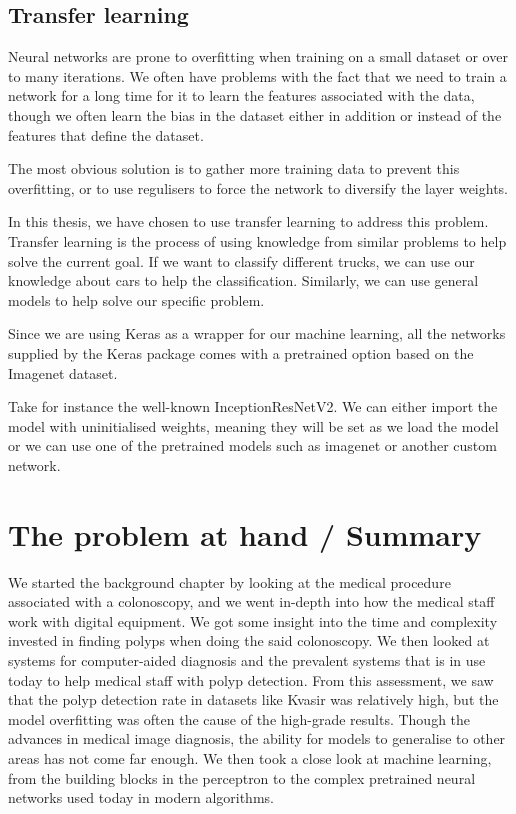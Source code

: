 \subsection{Transfer learning}
Neural networks are prone to overfitting when training on a small dataset or over to many iterations. We often have problems with the fact that we need to train a network for a long time for it to learn the features associated with the data, though we often learn the bias in the dataset either in addition or instead of the features that define the dataset.

The most obvious solution is to gather more training data to prevent this overfitting, or to use regulisers to force the network to diversify the layer weights. 

In this thesis, we have chosen to use transfer learning to address this problem. Transfer learning is the process of using knowledge from similar problems to help solve the current goal.  If we want to classify different trucks, we can use our knowledge about cars to help the classification.
Similarly, we can use general models to help solve our specific problem.

Since we are using Keras as a wrapper for our machine learning, all the networks supplied by the Keras package comes with a pretrained option based on the Imagenet dataset.


Take for instance the well-known InceptionResNetV2. We can either import the model with uninitialised weights, meaning they will be set as we load the model or we can use one of the pretrained models such as imagenet or another custom network.


    


     
   
\section{The problem at hand / Summary}
We started the background chapter by looking at the medical procedure associated with a colonoscopy, and we went in-depth into how the medical staff work with digital equipment. We got some insight into the time and complexity invested in finding polyps when doing the said colonoscopy.
We then looked at systems for computer-aided diagnosis and the prevalent systems that is in use today to help medical staff with polyp detection. 
From this assessment, we saw that the polyp detection rate in datasets like Kvasir was relatively high, but the model overfitting was often the cause of the high-grade results. Though the advances in medical image diagnosis, the ability for models to generalise to other areas has not come far enough.
We then took a close look at machine learning, from the building blocks in the perceptron to the complex pretrained neural networks used today in modern algorithms. 

